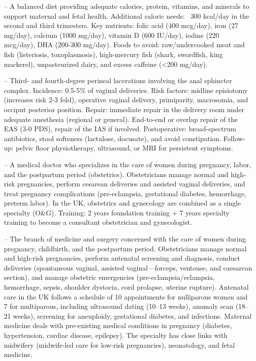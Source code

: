 -- A balanced diet providing adequate calories, protein, vitamins, and minerals to support maternal and fetal health. Additional caloric needs: ~300 kcal/day in the second and third trimesters. Key nutrients: folic acid (400 mcg/day), iron (27 mg/day), calcium (1000 mg/day), vitamin D (600 IU/day), iodine (220 mcg/day), DHA (200-300 mg/day). Foods to avoid: raw/undercooked meat and fish (listeriosis, toxoplasmosis), high-mercury fish (shark, swordfish, king mackerel), unpasteurized dairy, and excess caffeine (<200 mg/day).

-- Third- and fourth-degree perineal lacerations involving the anal sphincter complex. Incidence: 0.5-5\% of vaginal deliveries. Risk factors: midline episiotomy (increases risk 2-3 fold), operative vaginal delivery, primiparity, macrosomia, and occiput posterior position. Repair: immediate repair in the delivery room under adequate anesthesia (regional or general). End-to-end or overlap repair of the EAS (3-0 PDS), repair of the IAS if involved. Postoperative: broad-spectrum antibiotics, stool softeners (lactulose, docusate), and avoid constipation. Follow-up: pelvic floor physiotherapy, ultrasound, or MRI for persistent symptoms.

-- A medical doctor who specializes in the care of women during pregnancy, labor, and the postpartum period (obstetrics). Obstetricians manage normal and high-risk pregnancies, perform cesarean deliveries and assisted vaginal deliveries, and treat pregnancy complications (pre-eclampsia, gestational diabetes, hemorrhage, preterm labor). In the UK, obstetrics and gynecology are combined as a single specialty (O\&G). Training: 2 years foundation training + 7 years specialty training to become a consultant obstetrician and gynecologist.

-- The branch of medicine and surgery concerned with the care of women during pregnancy, childbirth, and the postpartum period. Obstetricians manage normal and high-risk pregnancies, perform antenatal screening and diagnosis, conduct deliveries (spontaneous vaginal, assisted vaginal—forceps, ventouse, and caesarean section), and manage obstetric emergencies (pre-eclampsia/eclampsia, hemorrhage, sepsis, shoulder dystocia, cord prolapse, uterine rupture). Antenatal care in the UK follows a schedule of 10 appointments for nulliparous women and 7 for multiparous, including ultrasound dating (10--13 weeks), anomaly scan (18--21 weeks), screening for aneuploidy, gestational diabetes, and infections. Maternal medicine deals with pre-existing medical conditions in pregnancy (diabetes, hypertension, cardiac disease, epilepsy). The specialty has close links with midwifery (midwife-led care for low-risk pregnancies), neonatology, and fetal medicine.


